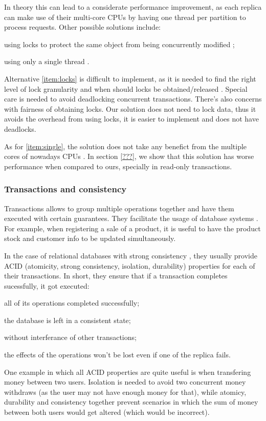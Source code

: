 \documentclass{vldb}
\begin{document}
In theory this can lead to a considerate performance improvement, as each replica can make use of their multi-core CPUs by having one thread per partition to process requests.
Other possible solutions include: 
\begin{enumerate*}[label=(\roman*)] 
	\item \label{item:locks} using locks to protect the same object from being concurrently modified \cite{???};
	\item \label{item:single} using only a single thread \cite{???}.
\end{enumerate*}

Alternative \ref{item:locks} is difficult to implement, as it is needed to find the right level of lock granularity and when should locks be obtained/released \cite{???}. 
Special care is needed to avoid deadlocking concurrent transactions. 
There's also concerns with fairness of obtaining locks.
Our solution does not need to lock data, thus it avoids the overhead from using locks, it is easier to implement and does not have deadlocks.

As for \ref{item:single}, the solution does not take any benefict from the multiple cores of nowadays CPUs \cite{???}. In section \ref{???}, we show that this solution has worse performance when compared to ours, specially in read-only transactions.

\subsubsection{Transactions and consistency}

Transactions allows to group multiple operations together and have them executed with certain guarantees.
They facilitate the usage of database systems \cite{???}.
For example, when registering a sale of a product, it is useful to have the product stock and customer info to be updated simultaneously. %

In the case of relational databases with strong consistency \cite{???} %
, they usually provide ACID (atomicity, strong consistency, isolation, durability) properties for each of their transactions.
In short, they ensure that if a transaction completes sucessfully, it got executed: 
\begin{enumerate*}
	\item all of its operations completed successfully;
	\item the database is left in a consistent state;
	\item without interferance of other transactions;
	\item the effects of the operations won't be lost even if one of the replica fails.
\end{enumerate*}
One example in which all ACID properties are quite useful is when transfering money between two users. Isolation is needed to avoid two concurrent money withdraws (as the user may not have enough money for that), while atomicy, durability and consistency together prevent scenarios in which the sum of money between both users would get altered (which would be incorrect).
\end{document}
